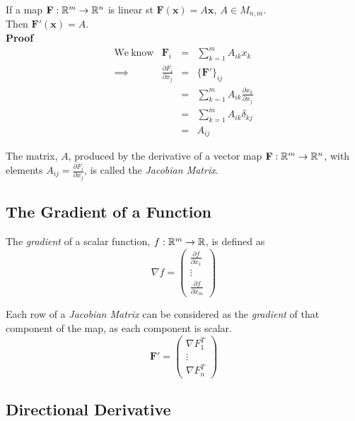 \documentclass[11pt,a4paper]{article}
\begin{document}
\newpage
{}
If a map $\textbf{F} : \mathbb{R}^m \to \mathbb{R}^n$ is linear st $\textbf{F}(\textbf{x}) = A\textbf{x},\ A \in M_{n,m}$.\\
Then $\textbf{F}'(\textbf{x}) = A$.\\
\textbf{Proof}
\[\begin{array}{rrcl}
  \mathrm{We\ know} &\textbf{F}_i&=&\sum_{k=1}^m A_{ik}x_k\\
  \implies& \frac{\partial F_i}{\partial x_j} &=& \{\textbf{F}'\}_{ij}\\
  &&=& \sum_{k=1}^m A_{ik} \frac{\partial x_k}{\partial x_j}\\
  &&=& \sum_{k=1}^m A_{ik} \delta_{kj}\\
  &&=& A_{ij}
\end{array}\]

The matrix, $A$, produced by the derivative of a vector map $\textbf{F}:\mathbb{R}^m\to\mathbb{R}^n$, with elements $A_{ij}=\frac{\partial F_i}{\partial x_j}$, is called the \textit{Jacobian Matrix}.\\

\subsection{The Gradient of a Function}

The \textit{gradient} of a scalar function, $f : \mathbb{R}^m \to \mathbb{R}$, is defined as
$$\nabla f = \begin{pmatrix} \frac{\partial f}{\partial x_1} \\ \vdots \\ \frac{\partial f}{\partial x_m}\end{pmatrix}$$

Each row of a \textit{Jacobian Matrix} can be considered as the \textit{gradient} of that component of the  map, as each component is scalar.
$$\textbf{F}' = \begin{pmatrix} \nabla F_1^T \\ \vdots \\ \nabla F_n^T\end{pmatrix}$$

\subsection{Directional Derivative}
\end{document}

